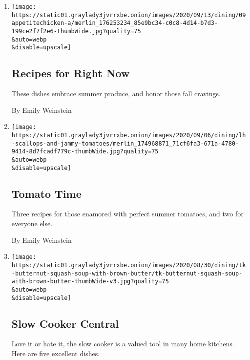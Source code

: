 \begin{enumerate}
\def\labelenumi{\arabic{enumi}.}
\item
  \href{/2020/09/11/dining/recipes-for-right-now.html}{}

  \texttt{[image: https://static01.graylady3jvrrxbe.onion/images/2020/09/13/dining/09appetitechicken-a/merlin\_176253234\_85e9bc34-c0c8-4d14-b7d3-199ce2f7f2e6-thumbWide.jpg?quality=75\\\&auto=webp\\\&disable=upscale]}

  \hypertarget{recipes-for-right-now}{%
  \subsection{Recipes for Right Now}\label{recipes-for-right-now}}

  These dishes embrace summer produce, and honor those fall cravings.

  By Emily Weinstein
\item
  \href{/2020/09/04/dining/tomato-time.html}{}

  \texttt{[image: https://static01.graylady3jvrrxbe.onion/images/2020/09/06/dining/lh-scallops-and-jammy-tomatoes/merlin\_174968871\_71cf6fa3-671a-4780-9414-8d7fcadf779c-thumbWide.jpg?quality=75\\\&auto=webp\\\&disable=upscale]}

  \hypertarget{tomato-time}{%
  \subsection{Tomato Time}\label{tomato-time}}

  Three recipes for those enamored with perfect summer tomatoes, and two
  for everyone else.

  By Emily Weinstein
\item
  \href{/2020/08/28/dining/slow-cooker-central.html}{}

  \texttt{[image: https://static01.graylady3jvrrxbe.onion/images/2020/08/30/dining/tk-butternut-squash-soup-with-brown-butter/tk-butternut-squash-soup-with-brown-butter-thumbWide-v3.jpg?quality=75\\\&auto=webp\\\&disable=upscale]}

  \hypertarget{slow-cooker-central}{%
  \subsection{Slow Cooker Central}\label{slow-cooker-central}}

  Love it or hate it, the slow cooker is a valued tool in many home
  kitchens. Here are five excellent dishes.


\end{enumerate}
